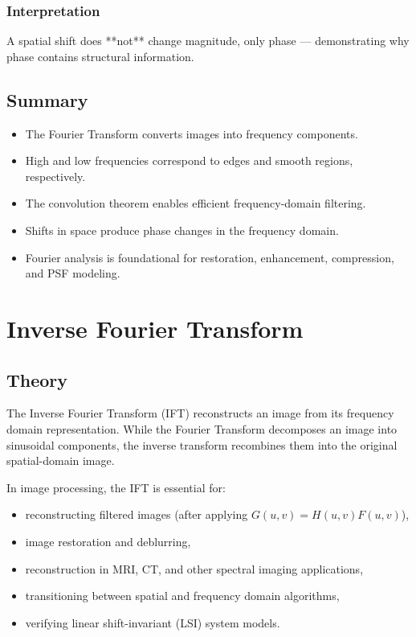\documentclass{AnantDocumentation}
\begin{document}
\subsubsection*{Interpretation}
A spatial shift does **not** change magnitude, only phase — demonstrating why phase contains structural information.

\subsection{Summary}

\begin{itemize}
\item The Fourier Transform converts images into frequency components.
\item High and low frequencies correspond to edges and smooth regions, respectively.
\item The convolution theorem enables efficient frequency-domain filtering.
\item Shifts in space produce phase changes in the frequency domain.
\item Fourier analysis is foundational for restoration, enhancement, compression, and PSF modeling.
\end{itemize}

\section{Inverse Fourier Transform}

\subsection{Theory}

The Inverse Fourier Transform (IFT) reconstructs an image from its frequency domain representation.  
While the Fourier Transform decomposes an image into sinusoidal components, the inverse transform recombines them into the original spatial-domain image.

In image processing, the IFT is essential for:
\begin{itemize}
\item reconstructing filtered images (after applying $G(u,v) = H(u,v)F(u,v)$),
\item image restoration and deblurring,
\item reconstruction in MRI, CT, and other spectral imaging applications,
\item transitioning between spatial and frequency domain algorithms,
\item verifying linear shift-invariant (LSI) system models.
\end{itemize}
\end{document}
